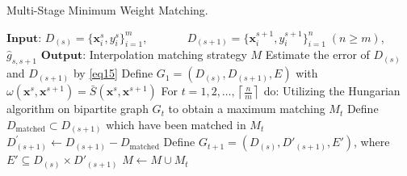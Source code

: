 \documentclass[lettersize,journal]{IEEEtran}
\begin{document}
\begin{algorithm}[H]
  \caption{Multi-Stage Minimum Weight Matching.}\label{alg:alg2}
  \begin{algorithmic}
  \STATE 
  \STATE $\mathbf{Input}$: $D_{(s)}=\{\boldsymbol{x}_i^{s},y_i^s\}_{i=1}^m$, 
  \STATE $\qquad\quad\; D_{(s+1)}=\{\boldsymbol{x}_i^{s+1},y_i^{s+1}\}_{i=1}^n\;(n\ge m)$, $\hat{g}_{s,s+1}$
  \STATE $\mathbf{Output}$: Interpolation matching strategy $M$
  \vspace{5pt} %
  \STATE Estimate the error of $D_{(s)}$ and $D_{(s+1)}$ by \eqref{eq15}
  \STATE Define $G_1=(D_{(s)},D_{(s+1)},E)$ with 
  \STATE $\omega(\boldsymbol{x}^{s},\boldsymbol{x}^{s+1})=\bar{S}(\boldsymbol{x}^{s},\boldsymbol{x}^{s+1})$
  \STATE For $t=1,2,\ldots,\left\lceil\frac{n}{m}\right\rceil$ do:
  \STATE \hspace{0.5cm}Utilizing the Hungarian algorithm on bipartite graph 
  \STATE \hspace{0.5cm}$G_t$ to obtain a maximum matching $M_t$
  \STATE \hspace{0.5cm}Define $D_{\text{matched}}\subset{D_{(s+1)}}$ which have been matched 
  \STATE \hspace{0.5cm}in $M_t$
  \STATE \hspace{0.5cm}$D^\prime_{(s+1)}\leftarrow D_{(s+1)}-D_{\text{matched}}$
  \STATE \hspace{0.5cm}Define $G_{t+1}=(D_{(s)},D'_{(s+1)},E')$, where 
  \STATE \hspace{0.5cm}$E'\subseteq D_{(s)}\times D'_{(s+1)}$
  \STATE \hspace{0.5cm}$M\leftarrow{M}\cup{M_t}$
  \end{algorithmic}
  \label{Alg2}
\end{algorithm}
\end{document}
